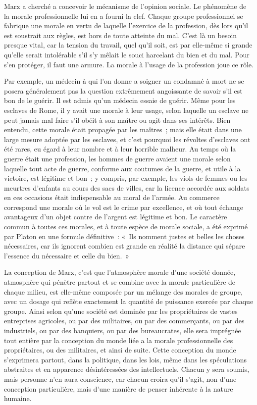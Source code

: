 \documentclass[french,twoside]{book} %
\begin{document}
Marx a cherché a concevoir le mécanisme de l'opinion sociale. Le phénomène de la morale professionnelle lui en a fourni la clef. Chaque groupe professionnel se fabrique une morale en vertu de laquelle l'exercice de la profession, dès lors qu'il est soustrait aux règles, est hors de toute atteinte du mal. C'est là un besoin presque vital, car la tension du travail, quel qu'il soit, est par elle-même si grande qu'elle serait intolérable s'il s'y mêlait le souci harcelant du bien et du mal. Pour s'en protéger, il faut une armure. La morale à l'usage de la profession joue ce rôle.\par
Par exemple, un médecin à qui l'on donne a soigner un condamné à mort ne se posera généralement pas la question extrêmement angoissante de savoir s'il est bon de le guérir. Il est admis qu'un médecin essaie de guérir. Même pour les esclaves de Rome, il y avait une morale à leur usage, selon laquelle un esclave ne peut jamais mal faire s'il obéit à son maître ou agit dans ses intérêts. Bien entendu, cette morale était propagée par les maîtres ; mais elle était dans une large mesure adoptée par les esclaves, et c'est pourquoi les révoltes d'esclaves ont été rares, eu égard à leur nombre et à leur horrible malheur. Au temps où la guerre était une profession, les hommes de guerre avaient une morale selon laquelle tout acte de guerre, conforme aux coutumes de la guerre, et utile à la victoire, est légitime et bon ; y compris, par exemple, les viols de femmes ou les meurtres d'enfants au cours des sacs de villes, car la licence accordée aux soldats en ces occasions était indispensable au moral de l'armée. Au commerce correspond une morale où le vol est le crime par excellence, et où tout échange avantageux d'un objet contre de l'argent est légitime et bon. Le caractère commun à toutes ces morales, et à toute espèce de morale sociale, a été exprimé par Platon en une formule définitive : « Ils nomment justes et belles les choses nécessaires, car ils ignorent combien est grande en réalité la distance qui sépare l'essence du nécessaire et celle du bien. »\par
La conception de Marx, c'est que l'atmosphère morale d'une société donnée, atmosphère qui pénètre partout et se combine avec la morale particulière de chaque milieu, est elle-même composée par un mélange des morales de groupe, avec un dosage qui reflète exactement la quantité de puissance exercée par chaque groupe. Ainsi selon qu'une société est dominée par les propriétaires de vastes entreprises agricoles, ou par des militaires, ou par des commerçants, ou par des industriels, ou par des banquiers, ou par des bureaucrates, elle sera imprégnée tout entière par la conception du monde liée a la morale professionnelle des propriétaires, ou des militaires, et ainsi de suite. Cette conception du monde s'exprimera partout, dans la politique, dans les lois, même dans les spéculations abstraites et en apparence désintéressées des intellectuels. Chacun y sera soumis, mais personne n'en aura conscience, car chacun croira qu'il s'agit, non d'une conception particulière, mais d'une manière de penser inhérente à la nature humaine.\par
\end{document}
